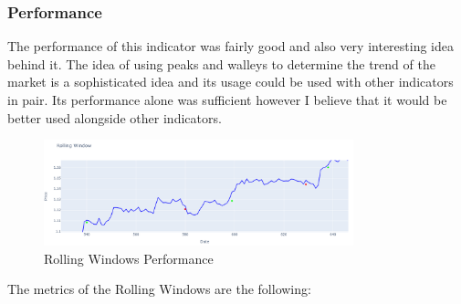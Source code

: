 \documentclass{imc-inf}
\begin{document}
			\subsubsection{Performance}
				The performance of this indicator was fairly good and also very interesting idea behind it. The idea of using peaks and walleys to determine the trend of the market
				is a sophisticated idea and its usage could be used with other indicators in pair. Its performance alone was sufficient however I believe that it would be 
				better used alongside other indicators.
				\begin{figure}[h!]
					\centering
					\includegraphics[width=0.8\textwidth]{rolling_windows_plot.png}
					\caption{Rolling Windows Performance}
					\label{fig:rolling_windows_performance}
				\end{figure}
				
				The metrics of the Rolling Windows are the following:	
\end{document}
